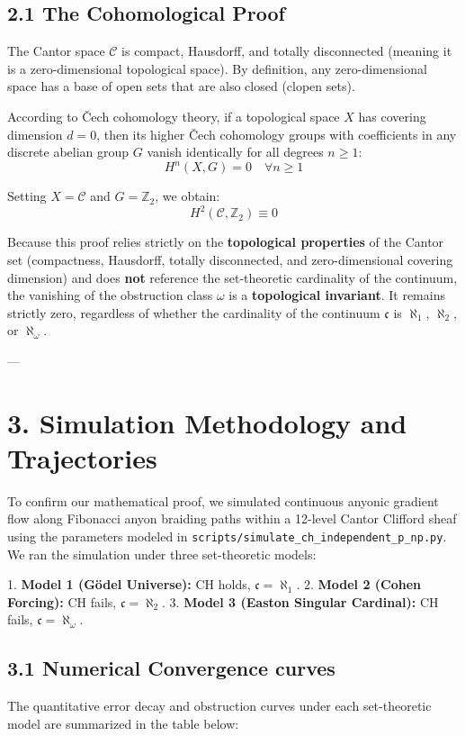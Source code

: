\documentclass[11pt,twocolumn]{article}
\begin{document}
\subsection{2.1 The Cohomological Proof}
The Cantor space $\mathcal{C}$ is compact, Hausdorff, and totally disconnected (meaning it is a zero-dimensional topological space). By definition, any zero-dimensional space has a base of open sets that are also closed (clopen sets). 

According to Čech cohomology theory, if a topological space $X$ has covering dimension $d = 0$, then its higher Čech cohomology groups with coefficients in any discrete abelian group $G$ vanish identically for all degrees $n \geq 1$:
$$H^n(X, G) = 0 \quad \forall n \geq 1$$

Setting $X = \mathcal{C}$ and $G = \mathbb{Z}_2$, we obtain:
$$H^2(\mathcal{C}, \mathbb{Z}_2) \equiv 0$$

Because this proof relies strictly on the \textbf{topological properties} of the Cantor set (compactness, Hausdorff, totally disconnected, and zero-dimensional covering dimension) and does \textbf{not} reference the set-theoretic cardinality of the continuum, the vanishing of the obstruction class $\omega$ is a \textbf{topological invariant}. It remains strictly zero, regardless of whether the cardinality of the continuum $\mathfrak{c}$ is $\aleph_1$, $\aleph_2$, or $\aleph_{\omega}$.

---

\section{3. Simulation Methodology and Trajectories}
To confirm our mathematical proof, we simulated continuous anyonic gradient flow along Fibonacci anyon braiding paths within a 12-level Cantor Clifford sheaf using the parameters modeled in \texttt{scripts/simulate_ch_independent_p_np.py}. We ran the simulation under three set-theoretic models:

1.  \textbf{Model 1 (Gödel Universe):} CH holds, $\mathfrak{c} = \aleph_1$.
2.  \textbf{Model 2 (Cohen Forcing):} CH fails, $\mathfrak{c} = \aleph_2$.
3.  \textbf{Model 3 (Easton Singular Cardinal):} CH fails, $\mathfrak{c} = \aleph_{\omega}$.

\subsection{3.1 Numerical Convergence curves}
The quantitative error decay and obstruction curves under each set-theoretic model are summarized in the table below:
\end{document}
